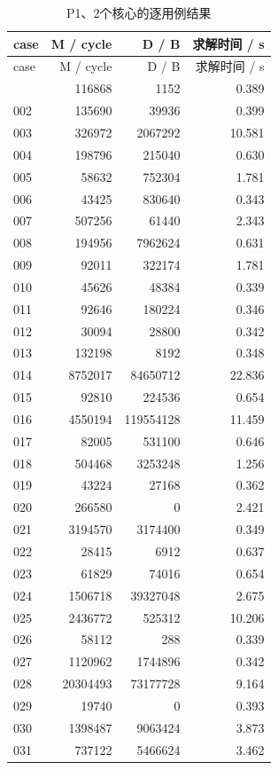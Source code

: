 \documentclass[anonymous,notoc]{gmcm2026}
\begin{document}
\begin{longtable}{lrrr}
\caption{P1、2个核心的逐用例结果}\\
\toprule
case & M / cycle & D / B & 求解时间 / s\\\midrule
\endfirsthead
\toprule
case & M / cycle & D / B & 求解时间 / s\\\midrule
\endhead
\bottomrule\endfoot
001 & 116868 & 1152 & 0.389 \\
002 & 135690 & 39936 & 0.399 \\
003 & 326972 & 2067292 & 10.581 \\
004 & 198796 & 215040 & 0.630 \\
005 & 58632 & 752304 & 1.781 \\
006 & 43425 & 830640 & 0.343 \\
007 & 507256 & 61440 & 2.343 \\
008 & 194956 & 7962624 & 0.631 \\
009 & 92011 & 322174 & 1.781 \\
010 & 45626 & 48384 & 0.339 \\
011 & 92646 & 180224 & 0.346 \\
012 & 30094 & 28800 & 0.342 \\
013 & 132198 & 8192 & 0.348 \\
014 & 8752017 & 84650712 & 22.836 \\
015 & 92810 & 224536 & 0.654 \\
016 & 4550194 & 119554128 & 11.459 \\
017 & 82005 & 531100 & 0.646 \\
018 & 504468 & 3253248 & 1.256 \\
019 & 43224 & 27168 & 0.362 \\
020 & 266580 & 0 & 2.421 \\
021 & 3194570 & 3174400 & 0.349 \\
022 & 28415 & 6912 & 0.637 \\
023 & 61829 & 74016 & 0.654 \\
024 & 1506718 & 39327048 & 2.675 \\
025 & 2436772 & 525312 & 10.206 \\
026 & 58112 & 288 & 0.339 \\
027 & 1120962 & 1744896 & 0.342 \\
028 & 20304493 & 73177728 & 9.164 \\
029 & 19740 & 0 & 0.393 \\
030 & 1398487 & 9063424 & 3.873 \\
031 & 737122 & 5466624 & 3.462 \\

\end{longtable}
\end{document}
